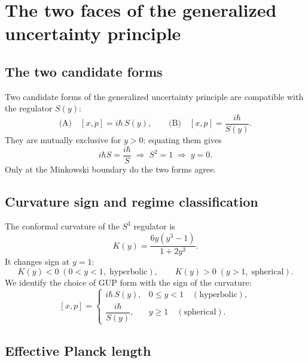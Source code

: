 \documentclass[a4paper,7pt,oneside,openany]{book}
\begin{document}
\section{The two faces of the generalized uncertainty principle}

\subsection{The two candidate forms}

Two candidate forms of the generalized uncertainty principle 
are compatible with the regulator $S(y)$:
\begin{equation}
\text{(A)}\quad [x,p]=i\hbar\,S(y),
\qquad
\text{(B)}\quad [x,p]=\frac{i\hbar}{S(y)}.
\label{eq:AB}
\end{equation}
They are mutually exclusive for $y>0$: equating them gives
\begin{equation}
i\hbar S=\frac{i\hbar}{S}
\;\Longrightarrow\;
S^{2}=1
\;\Longrightarrow\;
y=0.
\label{eq:exclusive}
\end{equation}
Only at the Minkowski boundary do the two forms agree.

\subsection{Curvature sign and regime classification}

The conformal curvature of the $S^{3}$ regulator is
\begin{equation}
K(y)=\frac{6y(y^{3}-1)}{1+2y^{3}}.
\label{eq:K}
\end{equation}
It changes sign at $y=1$:
\begin{equation}
K(y)<0\;(0<y<1,\;\text{hyperbolic}),
\qquad
K(y)>0\;(y>1,\;\text{spherical}).
\label{eq:K-sign}
\end{equation}
We identify the choice of GUP form with the sign of the 
curvature:
\begin{equation}
\boxed{
[x,p]=
\begin{cases}
i\hbar\,S(y), & 0\le y<1\quad(\text{hyperbolic}),\\[6pt]
\dfrac{i\hbar}{S(y)}, & y\ge 1\quad(\text{spherical}).
\end{cases}}
\label{eq:piecewise}
\end{equation}

\subsection{Effective Planck length}
\end{document}
